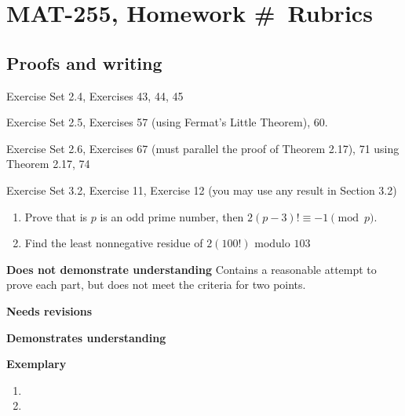 \documentclass[letterpaper, 11pt]{../ximera}
\begin{document}
\chapter{MAT-255, Homework \#\homework\ Rubrics}

\section*{Proofs and writing}  %
Exercise Set 2.4, Exercises 43, 44, 45

\noindent Exercise Set 2.5, Exercises 57 (using Fermat's Little Theorem), 60. 

\noindent Exercise Set 2.6,  Exercises 67 (must parallel the proof of Theorem 2.17), 71 using Theorem 2.17, 74 

\noindent Exercise Set 3.2, Exercise 11, Exercise 12 (you may use any result in Section 3.2)

\begin{ex}[Exercise 43] 
	\begin{enumerate}[label=(\alph*)]
 		\item Prove that is $p$ is an odd prime number, then $2(p-3)!\equiv -1 \pmod{p}$.
		\item Find the least nonnegative residue of $2(100!)$ modulo $103$
	\end{enumerate}
\end{ex}

\begin{writeRubric}
    \item \textbf{Does not demonstrate understanding}
     Contains a reasonable attempt to prove each part, but does not meet the criteria for two points.
    \item \textbf{Needs revisions}
     
    \item \textbf{Demonstrates understanding}
    
    \item \textbf{Exemplary}
        
\end{writeRubric}
                                       \begin{solution}
 	\begin{enumerate}[label=(\alph*)]
 		\item 
		\item 
	\end{enumerate}
\end{solution}
\end{document}
